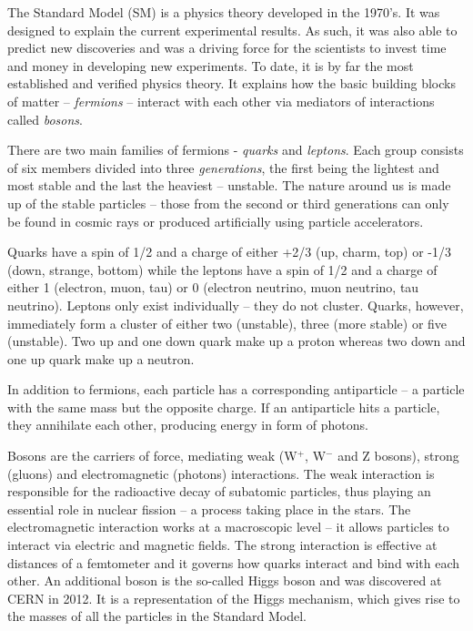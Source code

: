 \documentclass[twoside,12pt]{packages/mytustyle}  %
\let\origdescription\description
\renewenvironment{description}{
  \setlength{\leftmargini}{0em}
  \origdescription
  \setlength{\itemindent}{0em}
  \setlength{\labelsep}{\textwidth}
}
{\endlist}
\begin{document}
\begin{description}
\item[The Standard Model]
The Standard Model (SM) is a physics theory developed in the 1970's. It was designed to explain the current experimental results. As such, it was also able to predict new discoveries and was a driving force for the scientists to invest time and money in developing new experiments. To date, it is by far the most established and verified physics theory. It explains how the basic building blocks of matter -- \emph{fermions} -- interact with each other via mediators of interactions called \emph{bosons}.  

There are two main families of fermions - \emph{quarks} and \emph{leptons}. Each group consists of six members divided into three \emph{generations}, the first being the lightest and most stable and the last the heaviest -- unstable. The nature around us is made up of the stable particles -- those from the second or third generations can only be found in cosmic rays or produced artificially using particle accelerators.

Quarks have a spin of 1/2 and a charge of either +2/3 (up, charm, top)  or -1/3  (down, strange, bottom) while the leptons have a spin of 1/2  and a charge of either 1 (electron, muon, tau) or 0 (electron neutrino, muon neutrino, tau neutrino). Leptons only exist individually -- they do not cluster. Quarks, however, immediately form a cluster of either two (unstable), three (more stable) or five (unstable). Two up and one down quark make up a proton whereas two down and one up quark make up a neutron.

In addition to fermions, each particle has a corresponding antiparticle -- a particle with the same mass but the opposite charge. If an antiparticle hits a particle, they annihilate each other, producing energy in form of photons. 

Bosons are the carriers of force, mediating weak (W$^+$, W$^-$ and Z bosons), strong (gluons) and electromagnetic (photons) interactions. The weak interaction is responsible for the radioactive decay of subatomic particles, thus playing an essential role in nuclear fission -- a process taking place in the stars. The electromagnetic interaction works at a macroscopic level -- it allows particles to interact via electric and magnetic fields. The strong interaction is effective at distances of a femtometer and it governs how quarks interact and bind with each other. An additional boson is the so-called Higgs boson and was discovered at CERN in 2012. It is a representation of the Higgs mechanism, which gives rise to the masses of all the particles in the Standard Model.
\end{description}
\end{document}
